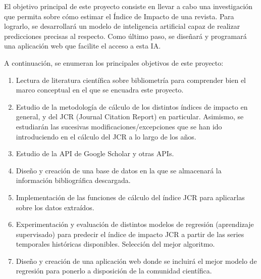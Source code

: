
El objetivo principal de este proyecto consiste en llevar a cabo una investigación que permita sobre cómo estimar el Índice de Impacto de una revista. Para lograrlo, se desarrollará un modelo de inteligencia artificial capaz de realizar predicciones precisas al respecto. Como último paso, se diseñará y programará una aplicación web que facilite el acceso a esta IA.

A continuación, se enumeran los principales objetivos de este proyecto:

\begin{enumerate}
\item Lectura de literatura científica sobre bibliometría para comprender bien el marco conceptual en el que se encuadra este proyecto.
\item Estudio de la metodología de cálculo de los distintos índices de impacto en general, y del JCR (Journal Citation Report) en particular. Asimismo, se estudiarán las sucesivas modificaciones/excepciones que se han ido introduciendo en el cálculo del JCR a lo largo de los años.
\item Estudio de la API de Google Scholar y otras APIs.
\item Diseño y creación de una base de datos en la que se almacenará la información bibliográfica descargada.
\item Implementación de las funciones de cálculo del índice JCR para aplicarlas sobre los datos extraídos. 
\item Experimentación y evaluación de distintos modelos de regresión (aprendizaje supervisado) para predecir el índice de impacto JCR a partir de las series temporales históricas disponibles. Selección del mejor algoritmo.
\item Diseño y creación de una aplicación web donde se incluirá el mejor modelo de regresión para ponerlo a disposición de la comunidad científica.
\end{enumerate}